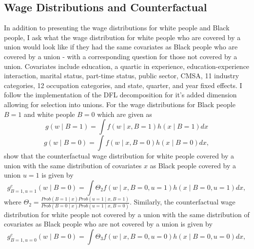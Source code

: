 \documentclass[11pt]{article}
\begin{document}
\subsection{Wage Distributions and Counterfactual}
In addition to presenting the wage distributions for white people and Black people, I ask what the wage distribution for white people who are covered by a union would look like if they had the same covariates as Black people who are covered by a union - with a corresponding question for those not covered by a union. Covariates include education, a quartic in experience, education-experience interaction, marital status, part-time status, public sector, CMSA, 11 industry categories, 12 occupation categories, and state, quarter, and year fixed effects. I follow the \citet{heywoodparent2012} implementation of the DFL decomposition for it's added dimension allowing for selection into unions. For the wage distributions for Black people $B = 1$ and white people $B = 0$ which are given as 
\begin{equation}
    g(w\mid B = 1) = \int f(w\mid x, B = 1) h(x \mid B = 1) dx
\end{equation}
\begin{equation}
    g(w\mid B = 0) = \int f(w\mid x, B = 0) h(x \mid B = 0) dx,
\end{equation}
\citet{heywoodparent2012} show that the counterfactual wage distribution for white people covered by a union with the same distribution of covariates $x$ as Black people covered by a union $u = 1$ is given by
\begin{equation}
g^c_{B=1, u = 1}(w\mid B = 0) = \int \Theta_2 f(w\mid x, B = 0, u = 1)h(x\mid B = 0, u = 1)dx,
\end{equation}
where $\Theta_2 = \frac{Prob(B = 1\mid x) Prob(u = 1\mid x, B = 1)}{Prob(B = 0\mid x)Prob(u = 1\mid x, B = 0)}$. 
Similarly, the counterfactual wage distribution for white people not covered by a union with the same distribution of covariates as Black people who are not covered by a union is given by
\begin{equation}
g^c_{B=1, u = 0}(w\mid B = 0) = \int \Theta_3 f(w\mid x, B = 0, u = 0)h(x\mid B = 0, u = 0)dx,
\end{equation}
\end{document}
